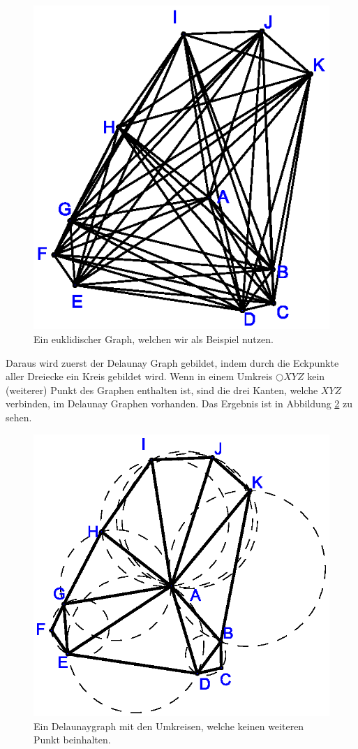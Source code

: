 \documentclass[a4paper,twoside]{IEEEtran}
\begin{document}
\begin{figure}[h!]
\centering
\includegraphics[width=0.6\linewidth]{beispielgraph.eps}
\caption{Ein euklidischer Graph, welchen wir als Beispiel nutzen.}
\label{fig:beispielgraph}
\end{figure}

Daraus wird zuerst der Delaunay Graph gebildet, indem durch die Eckpunkte aller Dreiecke ein Kreis gebildet wird.
Wenn in einem Umkreis $\bigcirc{XYZ} $ kein (weiterer) Punkt des Graphen enthalten ist, sind die drei Kanten, welche $XYZ $ verbinden, im Delaunay Graphen vorhanden.
Das Ergebnis ist in Abbildung \ref{fig:delaunay} zu sehen.

\begin{figure}[h!]
\centering
\includegraphics[width=0.7\linewidth]{Delaunay_Graph.eps}
\caption{Ein Delaunaygraph mit den Umkreisen, welche keinen weiteren Punkt beinhalten.}
\label{fig:delaunay}
\end{figure}
\end{document}
